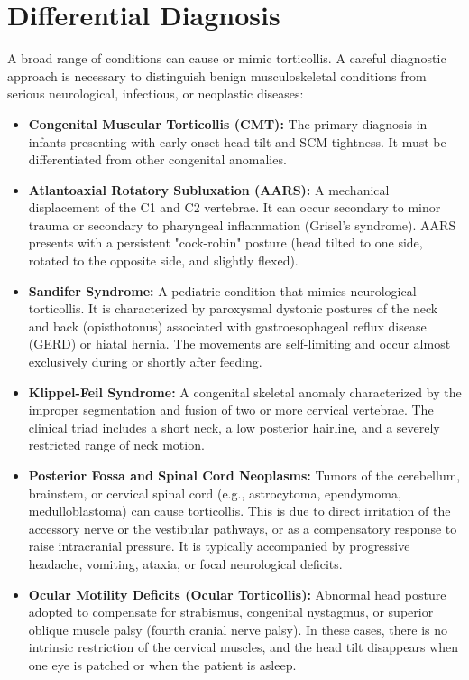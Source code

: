\section*{Differential Diagnosis}
A broad range of conditions can cause or mimic torticollis. A careful diagnostic approach is necessary to distinguish benign musculoskeletal conditions from serious neurological, infectious, or neoplastic diseases:

\begin{itemize}
    \item \textbf{Congenital Muscular Torticollis (CMT):} The primary diagnosis in infants presenting with early-onset head tilt and SCM tightness. It must be differentiated from other congenital anomalies.
    \item \textbf{Atlantoaxial Rotatory Subluxation (AARS):} A mechanical displacement of the C1 and C2 vertebrae. It can occur secondary to minor trauma or secondary to pharyngeal inflammation (Grisel's syndrome). AARS presents with a persistent "cock-robin" posture (head tilted to one side, rotated to the opposite side, and slightly flexed).
    \item \textbf{Sandifer Syndrome:} A pediatric condition that mimics neurological torticollis. It is characterized by paroxysmal dystonic postures of the neck and back (opisthotonus) associated with gastroesophageal reflux disease (GERD) or hiatal hernia. The movements are self-limiting and occur almost exclusively during or shortly after feeding.
    \item \textbf{Klippel-Feil Syndrome:} A congenital skeletal anomaly characterized by the improper segmentation and fusion of two or more cervical vertebrae. The clinical triad includes a short neck, a low posterior hairline, and a severely restricted range of neck motion.
    \item \textbf{Posterior Fossa and Spinal Cord Neoplasms:} Tumors of the cerebellum, brainstem, or cervical spinal cord (e.g., astrocytoma, ependymoma, medulloblastoma) can cause torticollis. This is due to direct irritation of the accessory nerve or the vestibular pathways, or as a compensatory response to raise intracranial pressure. It is typically accompanied by progressive headache, vomiting, ataxia, or focal neurological deficits.
    \item \textbf{Ocular Motility Deficits (Ocular Torticollis):} Abnormal head posture adopted to compensate for strabismus, congenital nystagmus, or superior oblique muscle palsy (fourth cranial nerve palsy). In these cases, there is no intrinsic restriction of the cervical muscles, and the head tilt disappears when one eye is patched or when the patient is asleep.

\end{itemize}
